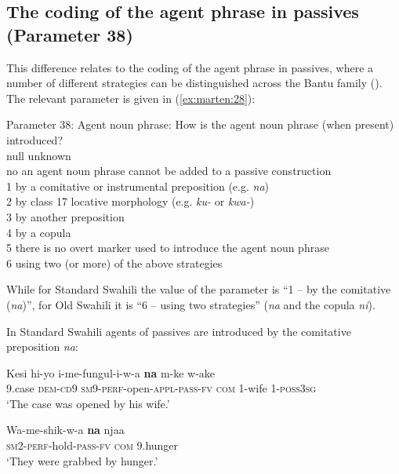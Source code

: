 \documentclass[output=paper]{langscibook}
\begin{document}
\subsection{The coding of the agent phrase in passives (Parameter 38)}\label{sec:marten:3.4}

This difference relates to the coding of the agent phrase in passives, where a number of different strategies can be distinguished across the Bantu family (\citealt{Fleisch2005, GuéroisForthcoming}). The relevant parameter is given in (\ref{ex:marten:28}):

\ea\label{ex:marten:28}Parameter 38: Agent noun phrase: How is the agent noun phrase (when present) introduced?\\   
\gllllllll null    unknown\\
no  {an agent noun phrase cannot be added to a passive construction} \\
1      {by a comitative or instrumental preposition (e.g. \textit{na})}\\
2      {by class 17 locative morphology (e.g. \textit{ku-} or \textit{kwa-})}\\
3      {by another preposition} \\
4      {by a copula}\\ 
5      {there is no overt marker used to introduce the agent noun phrase}\\
6      {using two (or more) of the above strategies}\\ 
\z

While for Standard Swahili the value of the parameter is ``1 -- by the comitative (\textit{na})'', for Old Swahili it is ``6 -- using two strategies'' (\textit{na} and the copula \textit{ni}).

  In Standard Swahili agents of passives are introduced by the comitative preposition \textit{na}:

\ea\label{ex:marten:29}
    \ea\label{ex:marten:29a} \gll  Kesi     hi-yo     i-me-fungul-i-w-a           \textbf{na}   m-ke     w-ake\\
9.case  \textsc{dem-cd9}    \textsc{sm9-perf}{}-open-\textsc{appl-pass-fv}  \textsc{com}  \textsc{1-}wife  1-\textsc{poss3sg}\\
   \glt ‘The case was opened by his wife.’   
    
    \ex\label{ex:marten:29b} \gll  Wa-me-shik-w-a         \textbf{na}     njaa\\
\textsc{sm2-perf}{}-hold-\textsc{pass-fv}  \textsc{com}    9.hunger\\
    \glt ‘They were grabbed by hunger.’
    \z
\z
\end{document}
